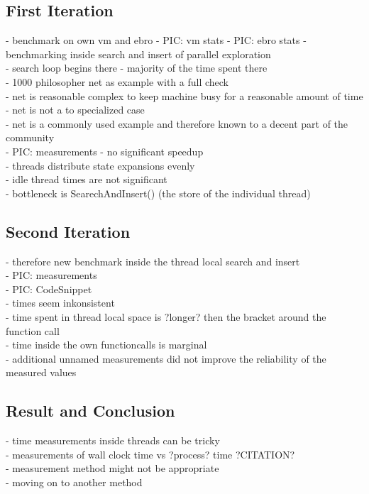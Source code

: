 \subsection{First Iteration}
- benchmark on own vm and ebro
- PIC: vm stats
- PIC: ebro stats
- benchmarking inside search and insert of parallel exploration\\
- search loop begins there - majority of the time spent there\\
- 1000 philosopher net as example with a full check\\ %
- net is reasonable complex to keep machine busy for a reasonable amount of time\\
- net is not a to specialized case\\
- net is a commonly used example and therefore known to a decent part of the community\\
- PIC: measurements
- no significant speedup\\
- threads distribute state expansions evenly\\
- idle thread times are not significant\\
- bottleneck is SearechAndInsert() (the store of the individual thread)\\

\subsection{Second Iteration}
- therefore new benchmark inside the thread local search and insert\\
- PIC: measurements\\
- PIC: CodeSnippet\\
- times seem inkonsistent\\
- time spent in thread local space is ?longer? then the bracket around the function call\\
- time inside the own functioncalls is marginal\\
- additional unnamed measurements did not improve the reliability of the measured values\\

\subsection{Result and Conclusion}
- time measurements inside threads can be tricky\\
- measurements of wall clock time vs ?process? time ?CITATION?\\
- measurement method might not be appropriate \\
- moving on to another method\\

